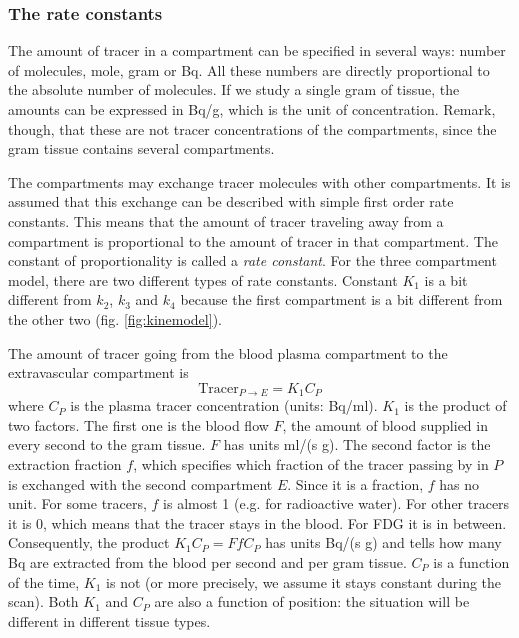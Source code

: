 \documentclass[11pt,oneside]{book}
\begin{document}
\subsubsection{The rate constants}
The amount of tracer in a compartment can be specified in several ways: number
of molecules, mole, gram or Bq. All these numbers are directly proportional to
the absolute number of molecules. If we study a single gram of tissue, the
amounts can be expressed in Bq/g, which is the unit of concentration. Remark,
though, that these are not tracer concentrations of the compartments, since the
gram tissue contains several compartments.

The compartments may exchange tracer molecules with other compartments. It is
assumed that this exchange can be described with simple first order rate
constants. This means that the amount of tracer traveling away from a
compartment is proportional to the amount of tracer in that compartment. The
constant of proportionality is called a {\em rate constant}. For the three
compartment model, there are two different types of rate constants. Constant
$K_1$ is a bit different from $k_2$, $k_3$ and $k_4$ because the first
compartment is a bit different from the other two  (fig. \ref{fig:kinemodel}).

The amount of tracer going from the blood plasma compartment to the
extravascular compartment is
\begin{equation}
  \mbox{Tracer}_{P \rightarrow E} = K_1 C_P
\end{equation}
where $C_P$ is the plasma tracer concentration (units: Bq/ml). $K_1$ is the
product of two factors. The first one is the blood flow $F$, the amount of
blood supplied in every second to the gram tissue. $F$ has units ml/(s g).
The second factor is the extraction fraction $f$, which specifies which
fraction of the tracer passing by in $P$ is exchanged with the second
compartment $E$. Since it is a fraction, $f$ has no unit. For some tracers,
$f$ is almost 1 (e.g. for radioactive water). For other tracers it is 0, which
means that the tracer stays in the blood. For FDG it is in
between. Consequently, the product $K_1 C_P = F f C_P$ has units Bq/(s g) and
tells how many Bq are extracted from the blood per second and per gram tissue.
$C_P$ is a function of the time, $K_1$ is not (or more precisely, we assume
it stays constant during the scan). Both $K_1$ and $C_P$ are also a
function of position: the situation will be different in different tissue types.
\end{document}
